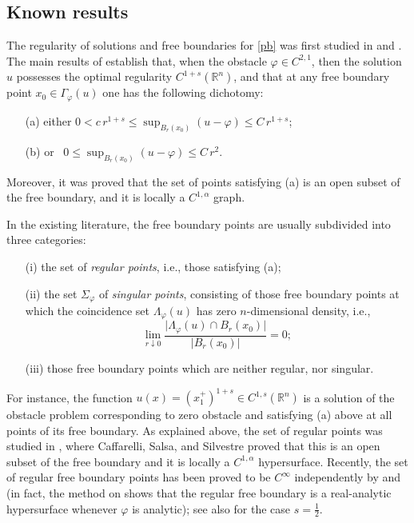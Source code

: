 \documentclass[11pt]{amsart}
\theoremstyle{plain}
\numberwithin{equation}{section}
\begin{document}

\subsection{Known results}

The regularity of solutions and free boundaries for \eqref{pb} was first studied in \cite{S} and \cite{CSS}.
The main results of \cite{CSS} establish that, when the obstacle $\varphi\in C^{2,1}$, then the solution $u$ possesses the optimal regularity $C^{1+s}({\mathbb R}^n)$, and that at any free boundary point $x_0\in \Gamma_\varphi(u)$ one has the following dichotomy:
\begin{itemize}
\item[(a)] either \qquad\quad $0<c\,r^{1+s}\leq \sup_{B_r(x_0)}(u-\varphi)\leq C\,r^{1+s}$;\quad \vspace{2mm}
\item[(b)] or \qquad\qquad\qquad\qquad\, $0\leq\sup_{B_r(x_0)}(u-\varphi)\leq C\,r^2$.
\end{itemize}
Moreover, it was proved that the set of points satisfying (a) is an open subset of the free boundary, and it is locally a $C^{1,\alpha}$ graph.

In the existing literature, the free boundary points are usually subdivided into
three categories:
\begin{itemize}
\item[(i)] the set of \emph{regular points}, i.e., those satisfying (a);
\item[(ii)] the set $\Sigma_\varphi$ of \emph{singular points}, consisting of those free boundary points at which the coincidence set $\Lambda_{\varphi}(u)$ has zero $n$-dimensional density, i.e.,
\[\lim_{r\downarrow 0}\frac{\bigl|\Lambda_{\varphi}(u) \cap B_r(x_0)\bigr|}{|B_r(x_0)|}=0;\]
\item[(iii)] those free boundary points which are neither regular, nor singular.
\end{itemize}

For instance, the function $u(x) = (x_1^+)^{1+s}\in C^{1,s}({\mathbb R}^n)$ is a solution of the obstacle problem corresponding to zero obstacle and satisfying (a) above at all points of its free boundary. As explained above, the set of regular points was studied in \cite{CSS}, where Caffarelli, Salsa, and Silvestre proved that this is an open subset of the free boundary and it is locally  a $C^{1,\alpha}$ hypersurface.
Recently, the set of regular free boundary points has been proved to be $C^\infty$ independently by \cite{KRS} and \cite{JN} (in fact, the method on \cite{KRS} shows that the regular free boundary is a real-analytic hypersurface whenever $\varphi$ is analytic); see also \cite{KPS,DS} for the case $s = \frac 12$.
\end{document}
